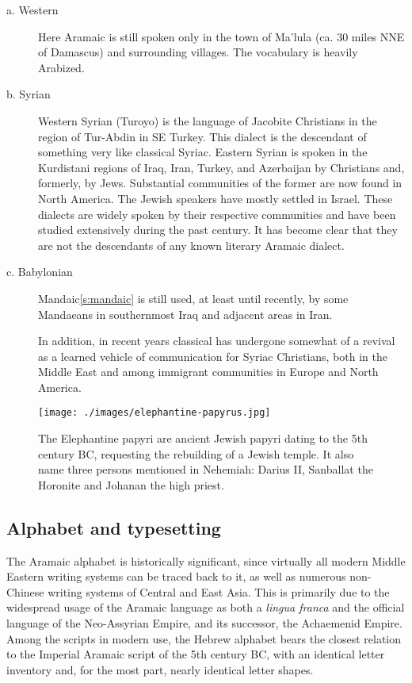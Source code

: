 \begin{description}

\item[a. Western]
Here Aramaic is still spoken only in
the town of Ma’lula (ca. 30 miles NNE of Damascus)
and surrounding villages. The vocabulary is heavily
Arabized.

\item[b. Syrian]
Western Syrian (Turoyo) is the language
of Jacobite Christians in the region of Tur-Abdin in
SE Turkey. This dialect is the descendant of
something very like classical Syriac. Eastern Syrian
is spoken in the Kurdistani regions of Iraq, Iran,
Turkey, and Azerbaijan by Christians and, formerly,
by Jews. Substantial communities of the former are
now found in North America. The Jewish speakers
have mostly settled in Israel. These dialects are
widely spoken by their respective communities and
have been studied extensively during the past
century. It has become clear that they are not the
descendants of any known literary Aramaic dialect.

\item[c. Babylonian] 

Mandaic\ref{s:mandaic} is still used, at least until
recently, by some Mandaeans in southernmost Iraq
and adjacent areas in Iran.

In addition, in recent years classical  has
undergone somewhat of a revival as a learned vehicle
of communication for Syriac Christians, both in the
Middle East and among immigrant communities in
Europe and North America.
\end{description}

\begin{figure}[htbp]
\centering
\texttt{[image: ./images/elephantine-papyrus.jpg]}

\caption{The Elephantine papyri are ancient Jewish papyri dating to the 5th century BC, requesting the rebuilding of a Jewish temple. It also name three persons mentioned in Nehemiah: Darius II, Sanballat the Horonite and Johanan the high priest.}

\end{figure}


\subsection{Alphabet and typesetting}

The Aramaic alphabet is historically significant, since virtually all modern Middle Eastern writing systems can be traced back to it, as well as numerous non-Chinese writing systems of Central and East Asia. This is primarily due to the widespread usage of the Aramaic language as both a \emph{lingua franca} and the official language of the Neo-Assyrian Empire, and its successor, the Achaemenid Empire. Among the scripts in modern use, the Hebrew alphabet bears the closest relation to the Imperial Aramaic script of the 5th century BC, with an identical letter inventory and, for the most part, nearly identical letter shapes.

